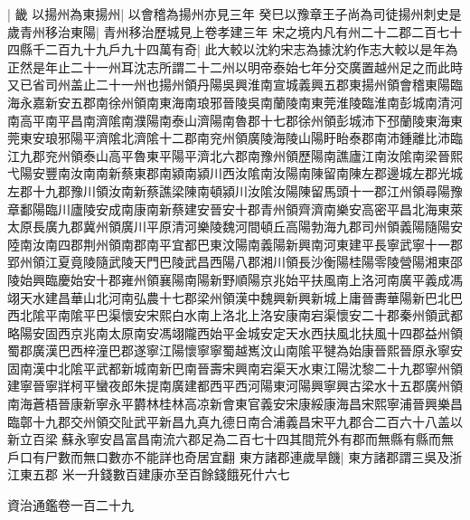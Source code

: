 |{
	畿}
以揚州為東揚州|{
	以會稽為揚州亦見三年}
癸巳以豫章王子尚為司徒揚州刺史是歲青州移治東陽|{
	青州移治歷城見上卷孝建三年}
宋之境内凡有州二十二郡二百七十四縣千二百九十九戶九十四萬有奇|{
	此大較以沈約宋志為據沈約作志大較以是年為正然是年止二十一州耳沈志所謂二十二州以明帝泰始七年分交廣置越州足之而此時又已省司州盖止二十一州也揚州領丹陽吳興淮南宣城義興五郡東揚州領會稽東陽臨海永嘉新安五郡南徐州領南東海南琅邪晉陵吳南蘭陵南東莞淮陵臨淮南彭城南清河南高平南平昌南濟隂南濮陽南泰山濟陽南魯郡十七郡徐州領彭城沛下邳蘭陵東海東莞東安琅邪陽平濟隂北濟隂十二郡南兖州領廣陵海陵山陽盱眙泰郡南沛鍾離比沛臨江九郡兖州領泰山高平魯東平陽平濟北六郡南豫州領歷陽南譙廬江南汝隂南梁晉熙弋陽安豐南汝南南新蔡東郡南潁南潁川西汝隂南汝陽南陳留南陳左郡邊城左郡光城左郡十九郡豫川領汝南新蔡譙梁陳南頓潁川汝隂汝陽陳留馬頭十一郡江州領尋陽豫章鄱陽臨川廬陵安成南康南新蔡建安晉安十郡青州領齊濟南樂安高密平昌北海東萊太原長廣九郡冀州領廣川平原清河樂陵魏河間頓丘高陽勃海九郡司州領義陽隨陽安陸南汝南四郡荆州領南郡南平宜都巴東汶陽南義陽新興南河東建平長寧武寧十一郡郢州領江夏竟陵隨武陵天門巴陵武昌西陽八郡湘川領長沙衡陽桂陽零陵營陽湘東邵陵始興臨慶始安十郡雍州領襄陽南陽新野順陽京兆始平扶風南上洛河南廣平義成馮翊天水建昌華山北河南弘農十七郡梁州領漢中魏興新興新城上庸晉夀華陽新巴北巴西北隂平南隂平巴渠懷安宋熙白水南上洛北上洛安康南宕渠懷安二十郡秦州領武都略陽安固西京兆南太原南安馮翊隴西始平金城安定天水西扶風北扶風十四郡益州領蜀郡廣漢巴西梓潼巴郡遂寧江陽懷寧寧蜀越嶲汶山南隂平犍為始康晉熙晉原永寧安固南漢中北隂平武都新城南新巴南晉壽宋興南宕渠天水東江陽沈黎二十九郡寧州領建寧晉寧牂柯平蠻夜郎朱提南廣建都西平西河陽東河陽興寧興古梁水十五郡廣州領南海蒼梧晉康新寧永平欝林桂林高凉新會東官義安宋康綏康海昌宋熙寧浦晉興樂昌臨鄣十九郡交州領交阯武平新昌九真九德日南合浦義昌宋平九郡合二百六十八盖以新立百梁蘇永寧安昌富昌南流六郡足為二百七十四其間荒外有郡而無縣有縣而無戶口有尸數而無口數亦不能詳也奇居宜翻}
東方諸郡連歲旱饑|{
	東方諸郡謂三吳及浙江東五郡}
米一升錢數百建康亦至百餘錢餓死什六七

資治通鑑卷一百二十九
